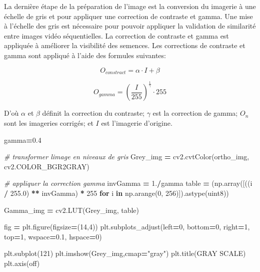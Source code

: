 \documentclass[
]{article}
\newenvironment{Shaded}{\begin{snugshade}}{\end{snugshade}}
\newcommand{\CommentTok}[1]{\textcolor[rgb]{0.56,0.35,0.01}{\textit{#1}}}
\newcommand{\ControlFlowTok}[1]{\textcolor[rgb]{0.13,0.29,0.53}{\textbf{#1}}}
\newcommand{\DecValTok}[1]{\textcolor[rgb]{0.00,0.00,0.81}{#1}}
\newcommand{\FloatTok}[1]{\textcolor[rgb]{0.00,0.00,0.81}{#1}}
\newcommand{\KeywordTok}[1]{\textcolor[rgb]{0.13,0.29,0.53}{\textbf{#1}}}
\newcommand{\NormalTok}[1]{#1}
\newcommand{\OperatorTok}[1]{\textcolor[rgb]{0.81,0.36,0.00}{\textbf{#1}}}
\newcommand{\StringTok}[1]{\textcolor[rgb]{0.31,0.60,0.02}{#1}}
\begin{document}
La dernière étape de la préparation de l'image est la conversion du
imagerie à une échelle de gris et pour appliquer une correction de contraste et gamma.
Une mise à l'échelle des gris est nécessaire pour pouvoir appliquer la validation de similarité entre
images vidéo séquentielles. La correction de contraste et gamma est appliquée à
améliorer la visibilité des semences. Les corrections de contraste et gamma sont
appliqué à l'aide des formules suivantes:

\begin{equation}
O_{constract} = \alpha \cdot I + \beta
\label{eq:constract}
\end{equation}

\begin{equation}
O_{gamma} = \left(\frac{I}{255}\right)^\frac{1}{\gamma} \cdot 255
\label{eq:gamma}
\end{equation}

D'où \(\alpha\) et \(\beta\) définit la correction du contraste; \(\gamma\) est la correction de gamma; \(O_n\) sont les imageries corrigés; et \(I\) est l'imagerie d'origine.

\begin{Shaded}
\begin{Highlighting}[]
\NormalTok{gamma}\OperatorTok{=}\FloatTok{0.4}

\CommentTok{\# transformer l\textquotesingle{}image en niveaux de gris}
\NormalTok{Grey\_img }\OperatorTok{=}\NormalTok{ cv2.cvtColor(ortho\_img, cv2.COLOR\_BGR2GRAY)}

\CommentTok{\# appliquer la correction gamma}
\NormalTok{invGamma }\OperatorTok{=} \FloatTok{1.}\OperatorTok{/}\NormalTok{gamma}
\NormalTok{table }\OperatorTok{=}\NormalTok{ (np.array([((i }\OperatorTok{/} \FloatTok{255.0}\NormalTok{) }\OperatorTok{**}\NormalTok{ invGamma) }\OperatorTok{*} \DecValTok{255} 
            \ControlFlowTok{for}\NormalTok{ i }\KeywordTok{in}\NormalTok{ np.arange(}\DecValTok{0}\NormalTok{, }\DecValTok{256}\NormalTok{)]).astype(}\StringTok{\textquotesingle{}uint8\textquotesingle{}}\NormalTok{))}
    
\NormalTok{Gamma\_img }\OperatorTok{=}\NormalTok{ cv2.LUT(Grey\_img, table)}


\NormalTok{fig }\OperatorTok{=}\NormalTok{ plt.figure(figsize}\OperatorTok{=}\NormalTok{(}\DecValTok{14}\NormalTok{,}\DecValTok{4}\NormalTok{))}
\NormalTok{plt.subplots\_adjust(left}\OperatorTok{=}\DecValTok{0}\NormalTok{, bottom}\OperatorTok{=}\DecValTok{0}\NormalTok{, right}\OperatorTok{=}\DecValTok{1}\NormalTok{, top}\OperatorTok{=}\DecValTok{1}\NormalTok{, wspace}\OperatorTok{=}\FloatTok{0.1}\NormalTok{, hspace}\OperatorTok{=}\DecValTok{0}\NormalTok{)}

\NormalTok{plt.subplot(}\DecValTok{121}\NormalTok{)}
\NormalTok{plt.imshow(Grey\_img,cmap}\OperatorTok{=}\StringTok{"gray"}\NormalTok{)}
\NormalTok{plt.title(}\StringTok{\textquotesingle{}GRAY SCALE\textquotesingle{}}\NormalTok{)}
\NormalTok{plt.axis(}\StringTok{\textquotesingle{}off\textquotesingle{}}\NormalTok{) }
\end{Highlighting}
\end{Shaded}
\end{document}
